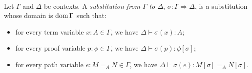 {\begin{code}
\\
%
\\
\>  \AgdaSymbol{:}  \AgdaSymbol{\{}\AgdaSymbol{\}} \AgdaSymbol{\{}\AgdaSymbol{\}} \AgdaSymbol{\{} \AgdaSymbol{:}   \AgdaSymbol{\}} \AgdaSymbol{\{}\AgdaSymbol{\}} \AgdaSymbol{\{}\AgdaSymbol{\}} \AgdaSymbol{\{}\AgdaSymbol{\}} \AgdaSymbol{\{}\AgdaSymbol{\}} \<%
\\
\>[0]\<[21]%
\>[21]          \AgdaSymbol{(} \AgdaInductiveConstructor{,} \AgdaSymbol{)}  \AgdaSymbol{(} \AgdaInductiveConstructor{,}    \AgdaSymbol{)}\<%
\\
%
\\
\>  \AgdaSymbol{:}  \AgdaSymbol{\{}\AgdaSymbol{\}} \AgdaSymbol{\{}\AgdaSymbol{\}} \AgdaSymbol{\{}\AgdaSymbol{\}} \AgdaSymbol{\{} \AgdaSymbol{:}   \AgdaSymbol{\}} \AgdaSymbol{\{} \AgdaSymbol{:}   \AgdaSymbol{\}} \AgdaSymbol{\{}\AgdaSymbol{\}} \AgdaSymbol{\{}\AgdaSymbol{\}} \AgdaSymbol{\{} \AgdaSymbol{:}  \AgdaSymbol{\}} \<%
\\
\>[21]\<[24]%
\>[24]                  \<%
\end{code}
}

Let $\Gamma$ and $\Delta$ be contexts.  A \emph{substitution from $\Gamma$ to $\Delta$}, $\sigma : \Gamma \Rightarrow \Delta$,
is a substitution whose domain is $\operatorname{dom} \Gamma$ such that:
\begin{itemize}
\item
for every term variable $x : A \in \Gamma$, we have $\Delta \vdash \sigma(x) : A$;
\item
for every proof variable $p : \phi \in \Gamma$, we have $\Delta \vdash \sigma(p) : \phi [ \sigma ]$;
\item
for every path variable $e : M =_A N \in \Gamma$, we have $\Delta \vdash \sigma(e) : M [ \sigma ] =_A N [ \sigma ]$.
\end{itemize}

